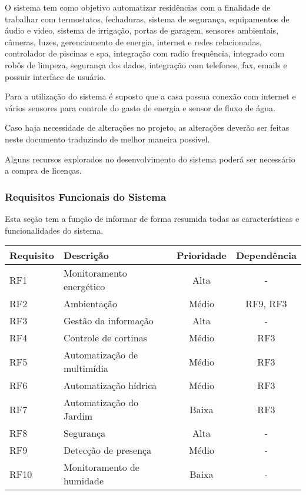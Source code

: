 
	O sistema tem como objetivo automatizar residências com a finalidade de trabalhar com termostatos, fechaduras,
	sistema de segurança, equipamentos de áudio e video, sistema de irrigação, portas de garagem, sensores ambientais,
	 câmeras, luzes, gerenciamento de energia, internet e redes relacionadas, controlador de piscinas e spa, integração
	  com radio frequência, integrado com robôs de limpeza, segurança dos dados, integração com telefones, fax, emails
	    e possuir interface de usuário.


	Para a utilização do sistema é suposto que a casa possua conexão com internet e vários sensores para controle do
	gasto de energia e sensor de fluxo de água.

	Caso haja necessidade de alterações no projeto, as alterações deverão ser feitas neste documento traduzindo de
	melhor maneira possível.


	Alguns recursos explorados no desenvolvimento do sistema poderá ser necessário a compra de licenças.


\subsubsection{Requisitos Funcionais do Sistema}

	Esta seção tem a função de informar de forma resumida todas as características e funcionalidades do sistema.

\begin{tabular}{|l|l|c|c|}
\hline
\textbf{Requisito} & \textbf{Descrição} & \textbf{Prioridade} & \textbf{Dependência}\tabularnewline
\hline
\hline
RF1 & Monitoramento energético & Alta & -\tabularnewline
\hline
RF2 & Ambientação & Médio & RF9, RF3\tabularnewline
\hline
RF3 & Gestão da informação & Alta & -\tabularnewline
\hline
RF4 & Controle de cortinas & Médio & RF3\tabularnewline
\hline
RF5 & Automatização de multimídia & Médio & RF3\tabularnewline
\hline
RF6 & Automatização hídrica & Médio & RF3\tabularnewline
\hline
RF7 & Automatização do Jardim & Baixa & RF3\tabularnewline
\hline
RF8 & Segurança & Alta & -\tabularnewline
\hline
RF9 & Detecção de presença & Médio & -\tabularnewline
\hline
RF10 & Monitoramento de humidade & Baixa & -\tabularnewline
\hline
\end{tabular}

